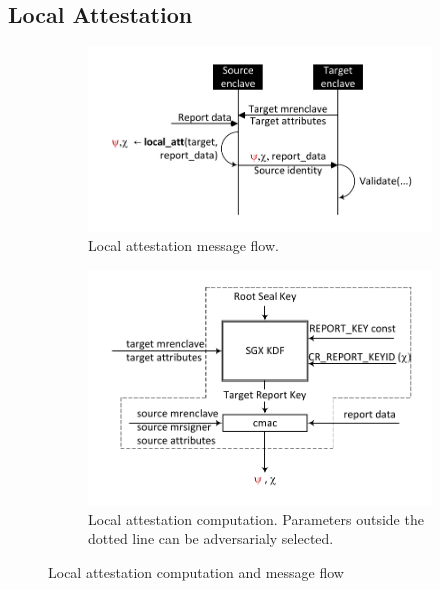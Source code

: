\documentclass[letterpaper]{article}
\begin{document}
  \subsection{Local Attestation}
  \label{ssec:localatt}

  \begin{figure}
    \centering
    \begin{subfigure}[h]{.5\textwidth}
      \centering
      \includegraphics[width=.95\linewidth]{Diagrams/LocalAttestationFlow}
      \caption{Local attestation message flow.}
      \label{fig:localattestationflow}
    \end{subfigure}%
    \begin{subfigure}[h]{.5\textwidth}
      \centering
      \includegraphics[width=.85\linewidth]{Diagrams/LocalAttestation}
      \caption{Local attestation computation. Parameters outside the
        dotted line can be adversarialy selected.}
      \label{fig:localattestation}
    \end{subfigure}%
    \caption{Local attestation computation and message flow}
    \label{fig:localatt}
  \end{figure}
\end{document}
